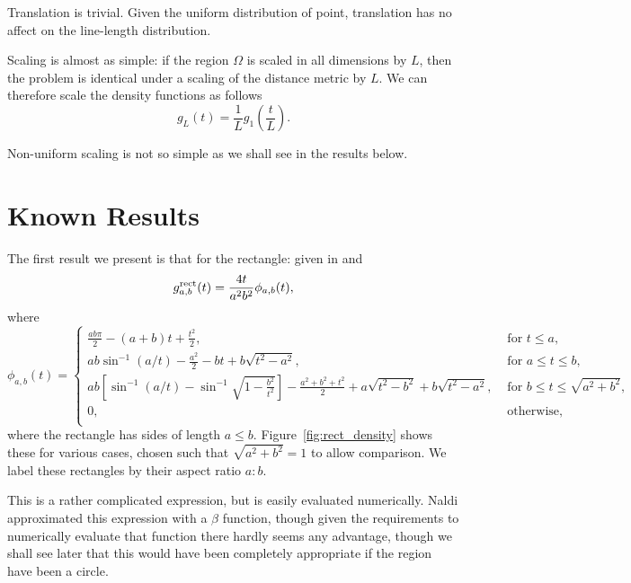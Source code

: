 \documentclass{article}
\begin{document}
Translation is trivial. Given the uniform distribution of point,
translation has no affect on the line-length distribution.

Scaling is almost as simple: if the region $\Omega$ is scaled in all
dimensions by $L$, then the problem is identical under a scaling of
the distance metric by $L$. We can therefore scale the density
functions as follows
\begin{equation}
 g_L(t) = \frac{1}{L} g_1\left(\frac{t}{L} \right). 
\end{equation}

Non-uniform scaling is not so simple as we shall see in the results
below.


\section{Known Results}
\label{sec:known}

The first result we present is that for the rectangle: given in
\cite[Theorem 2.4.4]{mathai_geom} and \cite[Theorem
2]{b.ghosh51:_random_rect}
\begin{equation}
  g^{\rm rect}_{a,b}(t) = \frac{4 t}{a^2 b^2} \phi_{a,b}(t),
  \label{eqn:rectangle}   
\end{equation}
where
\begin{equation}
  \phi_{a,b}(t) = \left\{
    \begin{array}{ll}
      \frac{ab \pi}{2} - (a+b) t + \frac{t^2}{2}, 
         & \mbox{ for } t \leq a, \\
      a b \sin^{-1} (a/t) - \frac{a^2}{2} - b t + b\sqrt{t^2 - a^2},
         & \mbox{ for } a \leq t \leq b, \\
      a b \left[ \sin^{-1} (a/t) - \sin^{-1} \sqrt{1 - \frac{b^2}{t^2}} \right]
        - \frac{a^2 + b^2 + t^2}{2} 
        + a\sqrt{t^2 - b^2}+ b\sqrt{t^2 - a^2},
         & \mbox{ for } b \leq t \leq \sqrt{a^2 + b^2}, \\
      0,
         & \mbox{ otherwise}, \\
    \end{array} \right. 
\end{equation}
where the rectangle has sides of length $a \leq
b$. Figure~\ref{fig:rect_density} shows these for various cases,
chosen such that $\sqrt{a^2 + b^2} = 1$ to allow comparison. We label
these rectangles by their aspect ratio $a: b$.

This is a rather complicated expression, but is easily evaluated
numerically.  Naldi \cite{m.naldi05:_connec_of_waxman_graph}
approximated this expression with a $\beta$ function, though given the
requirements to numerically evaluate that function there hardly seems
any advantage, though we shall see later that this would have been
completely appropriate if the region have been a circle.
\end{document}
